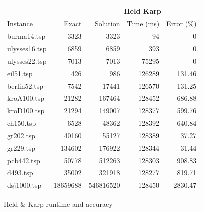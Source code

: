 \begin{figure}[H]
    \centering

    \begin{tabular}{lrrrr}
    \toprule
    \multicolumn{2}{c}{ } & \multicolumn{3}{c}{Held Karp} \\
    \hline
    Instance & Exact & Solution &   Time (ms) &   Error (\%) \\
    \hline
    burma14.tsp   &     3323 &       3323 &          94 &        0    \\
    ulysses16.tsp &     6859 &       6859 &         393 &        0    \\
    ulysses22.tsp &     7013 &       7013 &       75295 &        0    \\
    eil51.tsp     &      426 &        986 &      126289 &      131.46 \\
    berlin52.tsp  &     7542 &      17441 &      126570 &      131.25 \\
    kroA100.tsp   &    21282 &     167464 &      128452 &      686.88 \\
    kroD100.tsp   &    21294 &     149007 &      128377 &      599.76 \\
    ch150.tsp     &     6528 &      48362 &      128392 &      640.84 \\
    gr202.tsp     &    40160 &      55127 &      128389 &       37.27 \\
    gr229.tsp     &   134602 &     176922 &      128344 &       31.44 \\
    pcb442.tsp    &    50778 &     512263 &      128303 &      908.83 \\
    d493.tsp      &    35002 &     321918 &      128277 &      819.71 \\
    dsj1000.tsp   & 18659688 &  546816520 &      128450 &     2830.47 \\
    \bottomrule
    \end{tabular}

    \caption{Held \& Karp runtime and accuracy}
    \label{table:held-karp-runtime-accuracy}
\end{figure}


